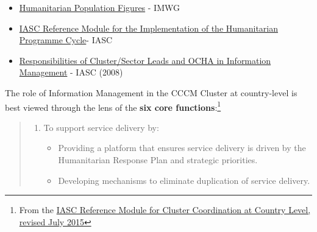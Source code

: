 \documentclass[
  a4paper,
  onecolumn,
  oneside]{book}
\providecommand{\tightlist}{%
  \setlength{\itemsep}{0pt}\setlength{\parskip}{0pt}}\usepackage{longtable,booktabs,array}
\begin{document}
\begin{tcolorbox}[enhanced jigsaw, left=2mm, rightrule=.15mm, arc=.35mm, coltitle=black, opacityback=0, colframe=quarto-callout-tip-color-frame, breakable, toprule=.15mm, titlerule=0mm, leftrule=.75mm, opacitybacktitle=0.6, title=\textcolor{quarto-callout-tip-color}{\faLightbulb}\hspace{0.5em}{Recommended reading}, bottomtitle=1mm, toptitle=1mm, bottomrule=.15mm, colbacktitle=quarto-callout-tip-color!10!white, colback=white]

\begin{itemize}
\tightlist
\item
  \href{files/humanitarianprofilesupportguidance_final_may2016.pdf}{Humanitarian
  Population Figures} - IMWG
\item
  \href{files/humanitarianprofilesupportguidance_final_may2016.pdf}{IASC
  Reference Module for the Implementation of the Humanitarian Programme
  Cycle}- IASC
\item
  \href{files/Operational\%20Guidance\%20on\%20Responsibilities\%20of\%20Cluster-Sector\%20Leads\%20and\%20OCHA\%20in\%20Information\%20Management.pdf}{Responsibilities
  of Cluster/Sector Leads and OCHA in Information Management} - IASC
  (2008)
\end{itemize}

\end{tcolorbox}

The role of Information Management in the CCCM Cluster at country-level
is best viewed through the lens of the \textbf{six core
functions}:\footnote{From the
  \href{files/Reference\%20Module\%20for\%20Cluster\%20Coordination\%20at\%20Country\%20Level.pdf}{IASC
  Reference Module for Cluster Coordination at Country Level, revised
  July 2015}}

\begin{quote}
\begin{enumerate}
\def\labelenumi{\arabic{enumi}.}
\tightlist
\item
  To support service delivery by:

  \begin{itemize}
  \tightlist
  \item
    Providing a platform that ensures service delivery is driven by the
    Humanitarian Response Plan and strategic priorities.
  \item
    Developing mechanisms to eliminate duplication of service delivery.
  \end{itemize}
\end{enumerate}
\end{quote}
\end{document}
